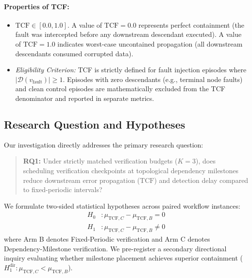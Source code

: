 \paragraph{Properties of TCF:}
\begin{itemize}
    \item $\text{TCF} \in [0.0, 1.0]$. A value of $\text{TCF} = 0.0$ represents perfect containment (the fault was intercepted before any downstream descendant executed). A value of $\text{TCF} = 1.0$ indicates worst-case uncontained propagation (all downstream descendants consumed corrupted data).
    \item \emph{Eligibility Criterion:} TCF is strictly defined for fault injection episodes where $|\mathcal{D}(v_{\text{fault}})| \ge 1$. Episodes with zero descendants (e.g., terminal node faults) and clean control episodes are mathematically excluded from the TCF denominator and reported in separate metrics.
\end{itemize}

\subsection{Research Question and Hypotheses}
Our investigation directly addresses the primary research question:
\begin{quote}
    \textbf{RQ1:} Under strictly matched verification budgets ($K = 3$), does scheduling verification checkpoints at topological dependency milestones reduce downstream error propagation ($\text{TCF}$) and detection delay compared to fixed-periodic intervals?
\end{quote}

We formulate two-sided statistical hypotheses across paired workflow instances:
\begin{align}
    H_0 &: \mu_{\text{TCF}, C} - \mu_{\text{TCF}, B} = 0 \\
    H_1 &: \mu_{\text{TCF}, C} - \mu_{\text{TCF}, B} \neq 0
\end{align}
where Arm B denotes Fixed-Periodic verification and Arm C denotes Dependency-Milestone verification. We pre-register a secondary directional inquiry evaluating whether milestone placement achieves superior containment ($H_1^{\text{dir}}: \mu_{\text{TCF}, C} < \mu_{\text{TCF}, B}$).
